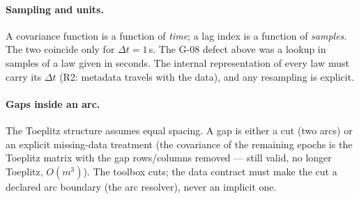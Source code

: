 \paragraph{Sampling and units.} A covariance function is a function of \emph{time}; a lag index is a function of \emph{samples}. The two coincide only for $\Delta t = 1$\,s. The G-08 defect above was a lookup in samples of a law given in seconds. The internal representation of every law must carry its $\Delta t$ (R2: metadata travels with the data), and any resampling is explicit.

\paragraph{Gaps inside an arc.} The Toeplitz structure assumes equal spacing. A gap is either a cut (two arcs) or an explicit missing-data treatment (the covariance of the remaining epochs is the Toeplitz matrix with the gap rows/columns removed --- still valid, no longer Toeplitz, $O(m^3)$). The toolbox cuts; the data contract must make the cut a declared arc boundary (the arc resolver), never an implicit one.
